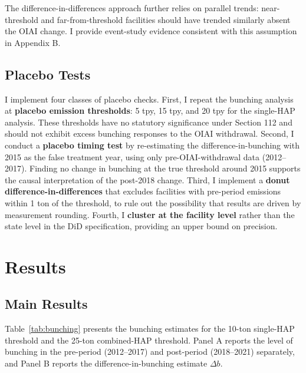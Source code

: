 \documentclass[12pt]{article}
\begin{document}
The difference-in-differences approach further relies on parallel trends: near-threshold and far-from-threshold facilities should have trended similarly absent the OIAI change. I provide event-study evidence consistent with this assumption in Appendix B.

\subsection{Placebo Tests}

I implement four classes of placebo checks. First, I repeat the bunching analysis at \textbf{placebo emission thresholds}: 5 tpy, 15 tpy, and 20 tpy for the single-HAP analysis. These thresholds have no statutory significance under Section 112 and should not exhibit excess bunching responses to the OIAI withdrawal. Second, I conduct a \textbf{placebo timing test} by re-estimating the difference-in-bunching with 2015 as the false treatment year, using only pre-OIAI-withdrawal data (2012--2017). Finding no change in bunching at the true threshold around 2015 supports the causal interpretation of the post-2018 change. Third, I implement a \textbf{donut difference-in-differences} that excludes facilities with pre-period emissions within 1 ton of the threshold, to rule out the possibility that results are driven by measurement rounding. Fourth, I \textbf{cluster at the facility level} rather than the state level in the DiD specification, providing an upper bound on precision.

\section{Results}

\subsection{Main Results}

Table~\ref{tab:bunching} presents the bunching estimates for the 10-ton single-HAP threshold and the 25-ton combined-HAP threshold. Panel A reports the level of bunching in the pre-period (2012--2017) and post-period (2018--2021) separately, and Panel B reports the difference-in-bunching estimate $\Delta b$.


\end{document}
